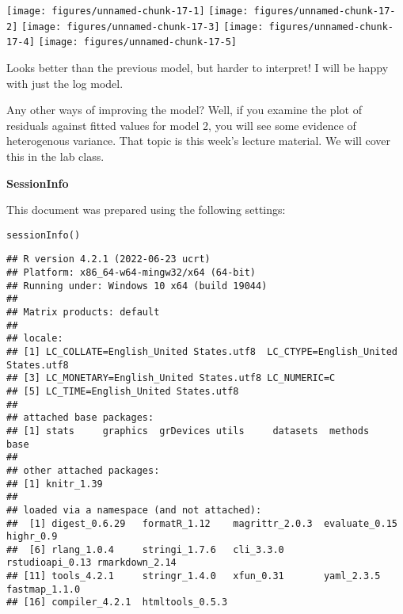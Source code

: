 \documentclass[11pt]{article}\usepackage[]{graphicx}\usepackage[]{xcolor}
\makeatletter
\newcommand{\hlstd}[1]{\textcolor[rgb]{0,0,0}{#1}}%
\newcommand{\hlkwd}[1]{\textcolor[rgb]{0,0.267,0.4}{#1}}%
\newenvironment{kframe}{%
 \def\at@end@of@kframe{}%
 \ifinner\ifhmode%
  \def\at@end@of@kframe{\end{minipage}}%
  \begin{minipage}{\columnwidth}%
 \fi\fi%
 \def\FrameCommand##1{\hskip\@totalleftmargin \hskip-\fboxsep
 \colorbox{shadecolor}{##1}\hskip-\fboxsep
     \hskip-\linewidth \hskip-\@totalleftmargin \hskip\columnwidth}%
 \MakeFramed {\advance\hsize-\width
   \@totalleftmargin\z@ \linewidth\hsize
   \@setminipage}}%
 {\par\unskip\endMakeFramed%
 \at@end@of@kframe}
\newenvironment{knitrout}{}{} %
\newcommand{\phead}[1]{{\bf{\color{mycol}#1}}}
\renewenvironment{knitrout}{%
  \begin{small}%
  \setlength{\topsep}{3.0pt plus 1.0pt minus 1.0pt}%
  \setlength{\partopsep}{1.0pt plus 1.0pt minus 1.0pt}%
  \setlength{\parskip}{0pt}}{\end{small}}
\makeatother
\begin{document}
\begin{knitrout}
{\centering \texttt{[image: figures/unnamed-chunk-17-1]} 
\texttt{[image: figures/unnamed-chunk-17-2]} 
\texttt{[image: figures/unnamed-chunk-17-3]} 
\texttt{[image: figures/unnamed-chunk-17-4]} 
\texttt{[image: figures/unnamed-chunk-17-5]} 

}


\end{knitrout}
Looks better than the previous model, but harder to interpret! I will be happy with just the log model.

Any other ways of improving the model? Well, if you examine the plot of residuals against fitted values for model 2,
you will see some evidence of heterogenous variance. That topic is this week's lecture material. We will cover this in the
lab class.

\phead{SessionInfo}
\label{sec:details}

This document was prepared using the following settings:
\begin{knitrout}
\color{fgcolor}\begin{kframe}
\begin{alltt}
\hlkwd{sessionInfo}\hlstd{()}
\end{alltt}
\begin{verbatim}
## R version 4.2.1 (2022-06-23 ucrt)
## Platform: x86_64-w64-mingw32/x64 (64-bit)
## Running under: Windows 10 x64 (build 19044)
## 
## Matrix products: default
## 
## locale:
## [1] LC_COLLATE=English_United States.utf8  LC_CTYPE=English_United States.utf8   
## [3] LC_MONETARY=English_United States.utf8 LC_NUMERIC=C                          
## [5] LC_TIME=English_United States.utf8    
## 
## attached base packages:
## [1] stats     graphics  grDevices utils     datasets  methods   base     
## 
## other attached packages:
## [1] knitr_1.39
## 
## loaded via a namespace (and not attached):
##  [1] digest_0.6.29   formatR_1.12    magrittr_2.0.3  evaluate_0.15   highr_0.9      
##  [6] rlang_1.0.4     stringi_1.7.6   cli_3.3.0       rstudioapi_0.13 rmarkdown_2.14 
## [11] tools_4.2.1     stringr_1.4.0   xfun_0.31       yaml_2.3.5      fastmap_1.1.0  
## [16] compiler_4.2.1  htmltools_0.5.3
\end{verbatim}
\end{kframe}
\end{knitrout}

%
%
\end{document}
